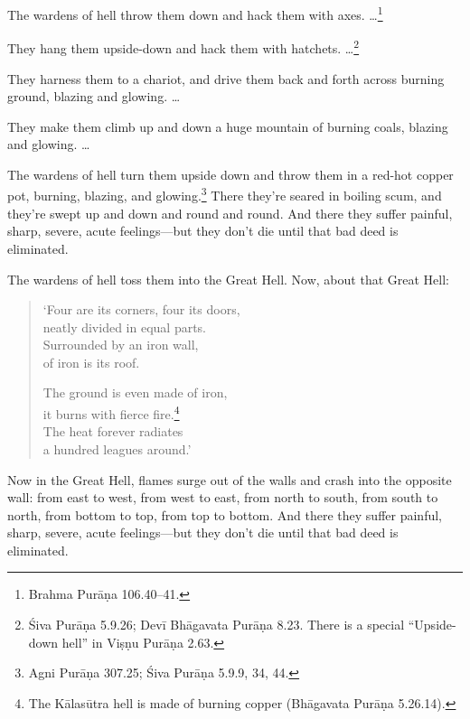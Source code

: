 \documentclass[12pt,openany]{book}%
\begin{document}
The wardens of hell throw them down and hack them with axes. …\footnote{Brahma \textsanskrit{Purāṇa} 106.40–41. } 

They hang them upside-down and hack them with hatchets. …\footnote{Śiva \textsanskrit{Purāṇa} 5.9.26; \textsanskrit{Devī} \textsanskrit{Bhāgavata} \textsanskrit{Purāṇa} 8.23. There is a special “Upside-down hell” in \textsanskrit{Viṣṇu} \textsanskrit{Purāṇa} 2.63. } 

They harness them to a chariot, and drive them back and forth across burning ground, blazing and glowing. … 

They make them climb up and down a huge mountain of burning coals, blazing and glowing. … 

The wardens of hell turn them upside down and throw them in a red-hot copper pot, burning, blazing, and glowing.\footnote{Agni \textsanskrit{Purāṇa} 307.25; Śiva \textsanskrit{Purāṇa} 5.9.9, 34, 44. } There they’re seared in boiling scum, and they’re swept up and down and round and round. And there they suffer painful, sharp, severe, acute feelings—but they don’t die until that bad deed is eliminated. 

The wardens of hell toss them into the Great Hell. Now, about that Great Hell: 

\begin{verse}%
‘Four are its corners, four its doors, \\
neatly divided in equal parts. \\
Surrounded by an iron wall, \\
of iron is its roof. 

The ground is even made of iron, \\
it burns with fierce fire.\footnote{The \textsanskrit{Kālasūtra} hell is made of burning copper (\textsanskrit{Bhāgavata} \textsanskrit{Purāṇa} 5.26.14). } \\
The heat forever radiates \\
a hundred leagues around.’ 

%
\end{verse}

Now in the Great Hell, flames surge out of the walls and crash into the opposite wall: from east to west, from west to east, from north to south, from south to north, from bottom to top, from top to bottom. And there they suffer painful, sharp, severe, acute feelings—but they don’t die until that bad deed is eliminated. 
\end{document}
